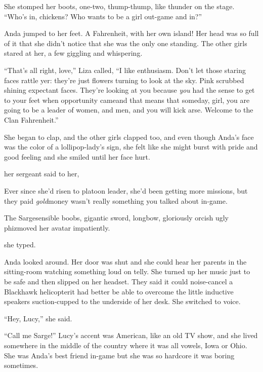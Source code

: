 She stomped her boots, one-two, thump-thump, like thunder on the
stage. “Who’s in, chickens? Who wants to be a girl out-game and
in?”

Anda jumped to her feet. A Fahrenheit, with her own island! Her
head was so full of it that she didn’t notice that she was the only
one standing. The other girls stared at her, a few giggling and
whispering.

“That’s all right, love,” Liza called, “I like enthusiasm. Don’t
let those staring faces rattle yer: they’re just flowers turning to
look at the sky. Pink scrubbed shining expectant faces. They’re
looking at you because \emph{you} had the sense to get to your feet
when opportunity came\dash{}and that means that someday, girl, you are
going to be a leader of women, and men, and you will kick arse.
Welcome to the Clan Fahrenheit.”

She began to clap, and the other girls clapped too, and even though
Anda’s face was the color of a lollipop-lady’s sign, she felt like
she might burst with pride and good feeling and she smiled until
her face hurt.

\tb

her sergeant said to her,

Ever since she’d risen to platoon leader, she’d been getting more
missions, but they paid \emph{gold}\dash{}money wasn’t really something
you talked about in-game.

The Sarge\dash{}sensible boobs, gigantic sword, longbow, gloriously
orcish ugly phiz\dash{}moved her avatar impatiently.

she typed.

Anda looked around. Her door was shut and she could hear her
parents in the sitting-room watching something loud on telly. She
turned up her music just to be safe and then slipped on her
headset. They said it could noise-cancel a Blackhawk helicopter\dash{}it
had better be able to overcome the little inductive speakers
suction-cupped to the underside of her desk. She switched to
voice.

“Hey, Lucy,” she said.

“Call me Sarge!” Lucy’s accent was American, like an old TV show,
and she lived somewhere in the middle of the country where it was
all vowels, Iowa or Ohio. She was Anda’s best friend in-game but
she was so hardcore it was boring sometimes.

